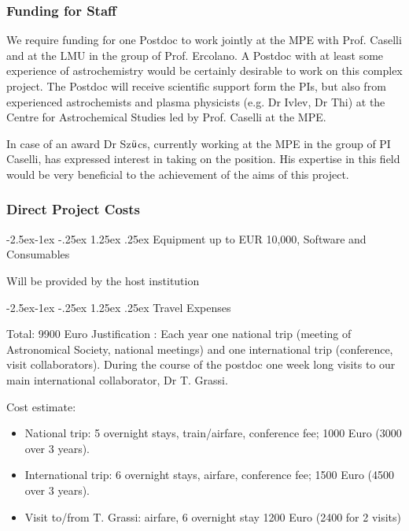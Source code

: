 \documentclass[10pt,fleqn,twoside]{article}
\makeatletter
\newcommand{\Tcol}{\color{blue}}
\renewcommand\paragraph{\@startsection{paragraph}{4}{\z@}%
            {-2.5ex\@plus -1ex \@minus -.25ex}%
            {1.25ex \@plus .25ex}%
            {\normalfont\normalsize\bfseries}}
\makeatother
\begin{document}
\subsubsection{\Tcol Funding for Staff}
We require funding for one Postdoc to work jointly at the MPE with Prof. Caselli and at the LMU in the group of
Prof. Ercolano.
A Postdoc with at least some experience of astrochemistry would be certainly desirable  to work on this complex  project. The Postdoc will receive scientific support form the PIs, but also from experienced astrochemists and plasma physicists (e.g. Dr Ivlev, Dr Thi) at the Centre for Astrochemical Studies led by Prof. Caselli at the MPE. 

In case of an award Dr Sz$\ddot{\textsf u}$cs, currently working at
the MPE in the group of PI Caselli, has expressed interest in taking on the position. His expertise in this field would be very beneficial to the achievement of the aims of this project.

\subsubsection{\Tcol Direct Project Costs}


\paragraph{\Tcol Equipment up to EUR 10,000, Software and Consumables}

Will be provided by the host institution

\paragraph{\Tcol Travel Expenses}

Total: 9900 Euro Justification : Each year one national trip (meeting of Astronomical Society, national
meetings) and one international trip (conference, visit
collaborators). 
During the course of the postdoc one week long visits to our main
international collaborator, Dr T. Grassi. 

Cost estimate: 
\begin{itemize}
\item National trip: 5 overnight stays, train/airfare,
conference fee; 1000 Euro (3000 over 3 years).
\item International trip: 6 overnight stays, airfare, conference fee;
  1500 Euro (4500 over 3 years).
\item Visit to/from T. Grassi: airfare, 6 overnight stay 1200 Euro (2400
  for 2 visits)
\end{itemize}
\end{document}
